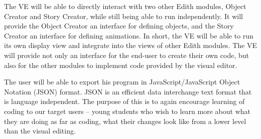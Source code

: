 \documentclass[a4paper, 10pt, oneside, draft]{article}
\begin{document}
\begin{usecase}
{\indent The VE will be able to directly interact with two other Edith modules, Object Creator and Story Creator, while still being able to run independently.  It will provide the Object Creator an interface for defining objects, and the Story Creator an interface for defining animations.  In short, the VE will be able to run its own display view and integrate into the views of other Edith modules. The VE will provide not only an interface for the end-user to create their own code, but also for the other modules to implement code provided by the visual editor.\newline	

\indent The user will be able to export his program in JavaScript/JavaScript Object Notation (JSON) format. JSON is an efficient data interchange text format that is language independent. The purpose of this is to again encourage learning of coding to our target users -- young students who wish to learn more about what they are doing as far as coding, what their changes look like from a lower level than the visual editing.\newline
}

\end{usecase}
\end{document}
